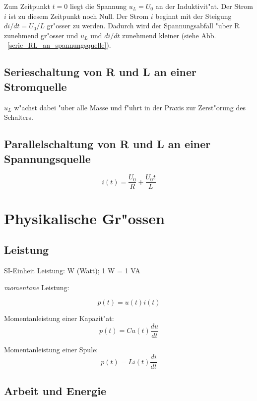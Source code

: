 \documentclass[german, 10pt, a4paper, headsepline]{scrreprt}
\theoremstyle{remark}
\begin{document}
Zum Zeitpunkt $t=0$ liegt die Spannung $u_L=U_0$ an der Induktivit"at. Der Strom $i$ ist zu diesem Zeitpunkt noch Null. Der Strom $i$ beginnt mit der Steigung $di/dt=U_0/L$ gr"osser zu werden. Dadurch wird der Spannungsabfall "uber R zunehmend gr"osser und $u_L$ und $di/dt$ zunehmend kleiner (siehe Abb. ~\ref{serie_RL_an_spannungsquelle}).

\subsection{Serieschaltung von R und L an einer Stromquelle}

$u_L$ w"achst dabei "uber alle Masse und f"uhrt in der Praxis zur Zerst"orung des Schalters.

\subsection{Parallelschaltung von R und L an einer Spannungsquelle}

\begin{displaymath}
	i(t) = \frac{U_0}{R} + \frac{U_0 t}{L}
\end{displaymath}

\section{Physikalische Gr"ossen}

\subsection{Leistung}

SI-Einheit Leistung: W (Watt); 1 W = 1 VA

\textit{momentane} Leistung:

\begin{displaymath}
	p(t) = u(t)i(t)
\end{displaymath}

Momentanleistung einer Kapazit"at:
\begin{displaymath}
	p(t) = Cu(t)\frac{du}{dt}
\end{displaymath}

Momentanleistung einer Spule:
\begin{displaymath}
	p(t) = Li(t)\frac{di}{dt}
\end{displaymath}

\subsection{Arbeit und Energie}
\end{document}
